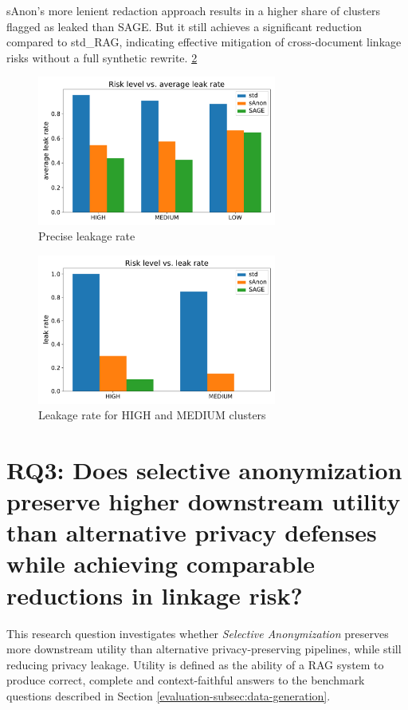 sAnon's more lenient redaction approach results in a higher share of clusters flagged as leaked than SAGE. But it still achieves a significant reduction compared to std\_RAG, indicating effective mitigation of cross-document linkage risks without a full synthetic rewrite. \ref{evaluation-fig:leakage_label}

\begin{figure}[h]
    \centering
    \includegraphics[width=0.7\textwidth]{figures/r1_precise_leak.pdf}
    \caption{Precise leakage rate}
    \label{evaluation-fig:precise_leakage}
\end{figure}  

\begin{figure}[h]
    \centering
    \includegraphics[width=0.7\textwidth]{figures/r1_leak_flag.pdf}
    \caption{Leakage rate for HIGH and MEDIUM clusters}
    \label{evaluation-fig:leakage_label}
\end{figure}  


\section{RQ3: Does selective anonymization preserve higher downstream utility than alternative privacy defenses while achieving comparable reductions in linkage risk?}

This research question investigates whether \textit{Selective Anonymization} preserves more downstream utility than alternative privacy-preserving pipelines, while still reducing privacy leakage. Utility is defined as the ability of a \ac{RAG} system to produce correct, complete and context-faithful answers to the benchmark questions described in Section \ref{evaluation-subsec:data-generation}.

